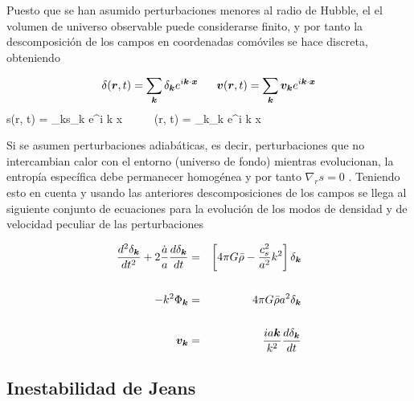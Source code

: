 Puesto que se han asumido perturbaciones menores al radio de Hubble, el
el volumen de universo observable puede considerarse finito, y por tanto 
la descomposición de los campos en coordenadas comóviles se hace discreta, 
obteniendo


\[  \delta(\bds r, t) =  \sum_{\bds k}\delta_{\bds k} e^{i \bds k \cdot \bds x} 
\ \ \ \ \ 
	\bds v(\bds r, t) =  \sum_{\bds k}\bds v_{\bds k} e^{i \bds k \cdot \bds x}\]
\eq{eq:FourierFields}
{  s(\bds r, t) =  \sum_{\bds k}s_{\bds k} e^{i \bds k \cdot \bds x} 
\ \ \ \ \ 
	\Phi(\bds r, t) =  \sum_{\bds k}\Phi_{\bds k} e^{i \bds k \cdot \bds x}}


Si se asumen perturbaciones adiabáticas, es decir, perturbaciones que no 
intercambian calor con el entorno (universo de fondo) mientras evolucionan,
la entropía específica debe permanecer homogénea y por tanto $\nabla_r s = 0$
\cite{longair2008}. Teniendo esto en cuenta y usando las anteriores 
descomposiciones de los campos se llega al siguiente conjunto de ecuaciones
para la evolución de los modos de densidad y de velocidad peculiar de las 
perturbaciones


\begin{eqnarray}
\label{eq:ContinuityEquationCMode}
\frac{ d ^2 \delta_{\boldsymbol{ k }} }{d t^2} + 2\frac{\dot a}{a}\frac{ d \delta_{\boldsymbol{ k }} }{d t} &=& 
\left[  4\pi G \bar \rho - \frac{c_s^2}{a^2}k^2  \right]\delta_{\boldsymbol{ k }}\\
\nonumber{}
\\
\label{eq:EulerEquationCMode}
- k^2 \Phi_{\boldsymbol{ k }} &=& 4\pi G \bar \rho a^2 \delta_{\boldsymbol{ k }}\\
\nonumber{}
\\
\label{eq:PoissonEquationCMode}
\boldsymbol{ v }_{\boldsymbol{ k }} &=& \frac{i a \boldsymbol{ k }}{k^2}\frac{ d \delta_{\boldsymbol{ k }} }{d t}
\end{eqnarray}


	\subsection{Inestabilidad de Jeans}
	\label{subsec:JeansInstability}
	
